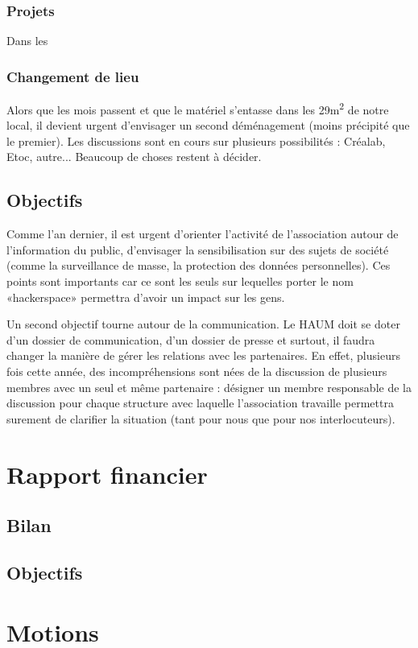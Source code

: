 \documentclass[11pt]{article}
\begin{document}
\subsubsection{Projets}

Dans les 

\subsubsection{Changement de lieu}

Alors que les mois passent et que le matériel s'entasse dans les 29m\textsuperscript{2} de notre local, il devient
urgent d'envisager un second déménagement (moins précipité que le premier). Les discussions sont en cours sur plusieurs
possibilités : Créalab, Etoc, autre... Beaucoup de choses restent à décider.

\subsection{Objectifs}

Comme l'an dernier, il est urgent d'orienter l'activité de l'association autour de l'information du public, d'envisager
la sensibilisation sur des sujets de société (comme la surveillance de masse, la protection des données personnelles).
Ces points sont importants car ce sont les seuls sur lequelles porter le nom «hackerspace» permettra d'avoir un
impact sur les gens.

Un second objectif tourne autour de la communication. Le HAUM doit se doter d'un dossier de communication, d'un dossier
de presse et surtout, il faudra changer la manière de gérer les relations avec les partenaires.
En effet, plusieurs fois cette année, des incompréhensions sont nées de la discussion de plusieurs membres avec un seul
et même partenaire : désigner un membre responsable de la discussion pour chaque structure avec laquelle l'association
travaille permettra surement de clarifier la situation (tant pour nous que pour nos interlocuteurs).

\section{Rapport financier}

\subsection{Bilan}

\subsection{Objectifs}


\section{Motions}
\end{document}
